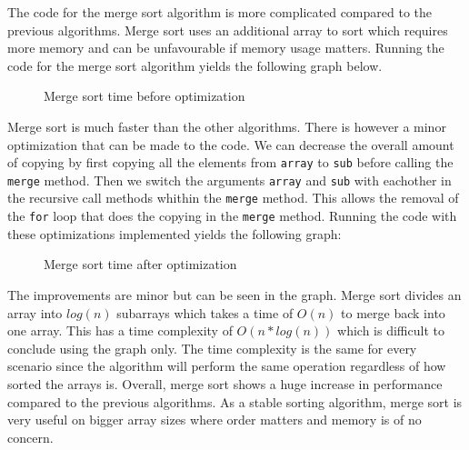 \documentclass[a4paper,11pt]{article}
\begin{document}
The code for the merge sort algorithm is more complicated compared to the 
previous algorithms. Merge sort uses an additional array to sort which 
requires more memory and can be unfavourable if memory usage matters. 
Running the code for the merge sort algorithm yields the following graph
below.

\begin{figure}[h]
  \centering
  \caption{Merge sort time before optimization}
  \label{fig:plot4}
\end{figure}

Merge sort is much faster than the other algorithms. There is however a 
minor optimization that can be made to the code. We can decrease the
overall amount of copying by first copying all the elements from 
{\tt array} to {\tt sub} before calling the 
{\tt merge} method. Then we switch the arguments
{\tt array} and {\tt sub} with eachother in the recursive call methods 
whithin the {\tt merge} method. This allows the
removal of the {\tt for} loop that does the copying in the {\tt merge} 
method. Running the code with these optimizations implemented yields the 
following graph:

\begin{figure}[h]
  \centering
  \caption{Merge sort time after optimization}
  \label{fig:plot5}
\end{figure}

The improvements are minor but can be seen in the graph. Merge sort 
divides an array into $ log(n)$ subarrays which takes a time of 
$ O(n)$ to merge back into one array. This has a time complexity of 
$ O(n*log(n))$ which is difficult to conclude using the graph only. The 
time complexity is the same for every scenario since the algorithm will 
perform the same operation regardless of how sorted the arrays is. 
Overall, merge sort shows a huge increase in performance compared to the
previous algorithms. As a stable sorting algorithm, merge sort is very 
useful on bigger array sizes where order matters and memory is of no 
concern. 
\end{document}
